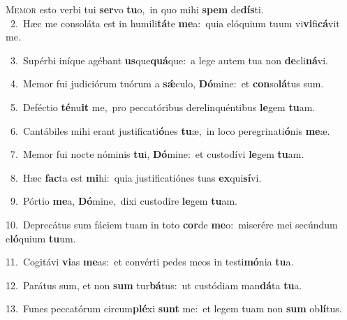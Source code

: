 \lettrine{\initial\textcolor{\initialcolor}{M}}{emor} esto verbi tui \textbf{ser}\-vo \textbf{tu}\-o,~\star in quo mihi \textbf{spem} de\-\textbf{dís}\-ti.\\
{\numbfont\textcolor{\numbcolor}{~2.}}~Hæc me consoláta est in humili\-\textbf{tá}\-te \textbf{me}\-a:~\star quia elóquium tuum vi\-\textbf{vi}\-fi\-\textbf{cá}\-vit me.\par
{\numbfont\textcolor{\numbcolor}{~3.}}~Supérbi iníque agébant \textbf{us}\-que\-\textbf{quá}\-que:~\star a lege autem tua non \textbf{de}\-cli\-\textbf{ná}\-vi.\par
{\numbfont\textcolor{\numbcolor}{~4.}}~Memor fui judiciórum tuórum a \textbf{sǽ}\-culo, \textbf{Dó}\-mine:~\star et \textbf{con}\-so\-\textbf{lá}\-tus sum.\par
{\numbfont\textcolor{\numbcolor}{~5.}}~Deféctio \textbf{té}\-nu\textbf{it} me,~\star pro peccatóribus derelinquéntibus \textbf{le}\-gem \textbf{tu}\-am.\par
{\numbfont\textcolor{\numbcolor}{~6.}}~Cantábiles mihi erant justificati\-\textbf{ó}\-nes \textbf{tu}\-æ,~\star in loco peregrinati\-\textbf{ó}\-nis \textbf{me}\-æ.\par
{\numbfont\textcolor{\numbcolor}{~7.}}~Memor fui nocte nóminis \textbf{tu}\-i, \textbf{Dó}\-mine:~\star et custodívi \textbf{le}\-gem \textbf{tu}\-am.\par
{\numbfont\textcolor{\numbcolor}{~8.}}~Hæc \textbf{fac}\-ta est \textbf{mi}\-hi:~\star quia justificatiónes tuas \textbf{ex}\-qui\-\textbf{sí}\-vi.\par
{\numbfont\textcolor{\numbcolor}{~9.}}~Pórtio \textbf{me}\-a, \textbf{Dó}\-mine,~\star dixi custodíre \textbf{le}\-gem \textbf{tu}\-am.\par
{\numbfont\textcolor{\numbcolor}{10.}}~Deprecátus sum fáciem tuam in toto \textbf{cor}\-de \textbf{me}\-o:~\star miserére mei secúndum e\-\textbf{ló}\-quium \textbf{tu}\-um.\par
{\numbfont\textcolor{\numbcolor}{11.}}~Cogitávi \textbf{vi}\-as \textbf{me}\-as:~\star et convérti pedes meos in testi\-\textbf{mó}\-nia \textbf{tu}\-a.\par
{\numbfont\textcolor{\numbcolor}{12.}}~Parátus sum, et non \textbf{sum} tur\-\textbf{bá}\-tus:~\star ut custódiam man\-\textbf{dá}\-ta \textbf{tu}\-a.\par
{\numbfont\textcolor{\numbcolor}{13.}}~Funes peccatórum circum\-\textbf{plé}\-xi \textbf{sunt} me:~\star et legem tuam non \textbf{sum} ob\-\textbf{lí}\-tus.\par
